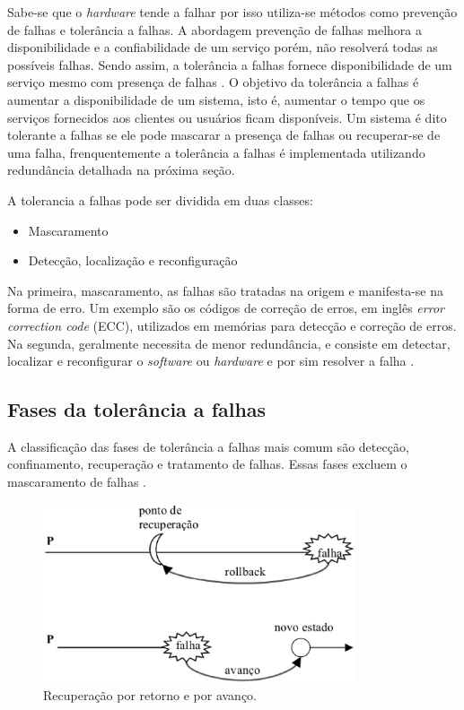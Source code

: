 Sabe-se que o \textit{hardware} tende a falhar por isso utiliza-se métodos como prevenção de falhas e tolerância a falhas.
A abordagem prevenção de falhas melhora a disponibilidade e a confiabilidade de um serviço porém, não resolverá todas as possíveis falhas.
Sendo assim, a tolerância a falhas fornece disponibilidade de um serviço mesmo com presença de falhas \cite{pankaj1994}.
O objetivo da tolerância a falhas é aumentar a disponibilidade de um sistema, isto é, aumentar o tempo que os serviços fornecidos aos 
clientes ou usuários ficam disponíveis. Um sistema é dito tolerante a falhas se ele pode mascarar a presença de falhas 
ou recuperar-se de uma falha, frenquentemente a tolerância a falhas é implementada utilizando redundância detalhada na próxima seção.

A tolerancia a falhas pode ser dividida em duas classes:
\begin{itemize}
 \item Mascaramento
 \item Detecção, localização e reconfiguração
\end{itemize}

Na primeira, mascaramento, as falhas são tratadas na origem e manifesta-se na forma de erro. Um exemplo são os 
códigos de correção de erros, em inglês \textit{error correction code} (ECC), utilizados em memórias para detecção e correção de erros.
Na segunda, geralmente necessita de menor redundância, e consiste em detectar, localizar e reconfigurar o \textit{software} ou
\textit{hardware} e por sim resolver a falha \cite{weber2002}.

\subsection{Fases da tolerância a falhas}

A classificação das fases de tolerância a falhas mais comum são detecção, confinamento, recuperação e tratamento de falhas. Essas fases excluem
o mascaramento de falhas \cite{weber2002}.

\begin{figure}[falhasrecup]
 \centering
 \includegraphics[height=200px]{img/recuperacao_ret_ava.eps}
 \caption{Recuperação por retorno e por avanço.}
 \label{fig:recuperacao_ret_ava}
\end{figure}


